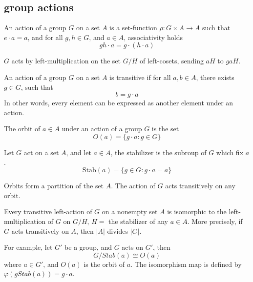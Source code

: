\subsection{group actions}
\begin{defn}[action]
    An action of a group $G$ on a set $A$ is a set-function $\rho: G\times A\to A$ such that $e\cdot a=a$, and for all $g,h\in G$, and $a\in A$, associativity holds
    \begin{equation*}
        gh\cdot a=g\cdot (h\cdot a)
    \end{equation*}
\end{defn}
\begin{example}
    $G$ acts by left-multiplication on the set $G/H$ of left-cosets, sending $aH$ to $gaH$.
\end{example}
\begin{defn}An action of a group $G$ on a set $A$ is transitive if for all $a,b\in A$, there exists $g\in G$, such that 
    \begin{equation*}
        b=g\cdot a
    \end{equation*}
    In other words, every element can be expressed as another element under an action.
\end{defn}
\begin{defn}[orbit]
    The orbit of $a\in A$ under an action of a group $G$ is the set 
    \begin{equation*}
        O(a)=\{g\cdot a: g\in G\}
    \end{equation*}
\end{defn}
\begin{defn}[stabilizer]
    Let $G$ act on a set $A$, and let $a\in A$, the stabilizer is the subroup of $G$ which fix $a$.
    \begin{equation*}
        \text{Stab}(a)=\{g\in G: g\cdot a=a\}
    \end{equation*}
\end{defn}
\begin{prop}
    Orbits form a partition of the set $A$. The action of $G$ acts transitively on any orbit.
\end{prop}
\begin{prop}
    Every transitive left-action of $G$ on a nonempty set $A$ is isomorphic to the left-multiplication of $G$ on $G/H$, $H=$ the stabilizer of any $a\in A$. More precisely, if $G$ acts transitively on $A$, then $|A|$ divides $|G|$. 

    For example, let $G'$ be a group, and $G$ acts on $G'$, then 
    \begin{equation*}
        G/Stab(a)\cong O(a)
    \end{equation*}
    where $a\in G'$, and $O(a)$ is the orbit of $a$. The isomorphism map is defined by $\varphi(gStab(a))=g\cdot a$.
\end{prop}
